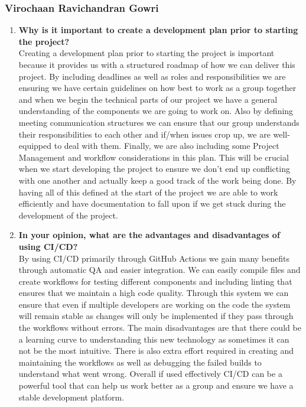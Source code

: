 \documentclass{article}
\begin{document}
\subsubsection*{Virochaan Ravichandran Gowri}
\begin{enumerate}
    \item \textbf{Why is it important to create a development plan prior to starting the
    project?} \\
    Creating a development plan prior to starting the project is important because it provides us with a structured roadmap of how we can deliver this project. By including deadlines as well as roles and responsibilities we are ensuring we have certain guidelines on how best to work as a group together and when we begin the technical parts of our project we have a general understanding of the components we are going to work on. Also by defining meeting communication structures we can ensure that our group understands their responsibilities to each other and if/when issues crop up, we are well-equipped to deal with them. Finally, we are also including some Project Management and workflow considerations in this plan. This will be crucial when we start developing the project to ensure we don't end up conflicting with one another and actually keep a good track of the work being done. By having all of this defined at the start of the project we are able to work efficiently and have documentation to fall upon if we get stuck during the development of the project.
    \item \textbf{In your opinion, what are the advantages and disadvantages of using CI/CD?} \\
    By using CI/CD primarily through GitHub Actions we gain many benefits through automatic QA and easier integration. We can easily compile files and create workflows for testing different components and including linting that ensures that we maintain a high code quality. Through this system we can ensure that even if multiple developers are working on the code the system will remain stable as changes will only be implemented if they pass through the workflows without errors. The main disadvantages are that there could be a learning curve to understanding this new technology as sometimes it can not be the most intuitive. There is also extra effort required in creating and maintaining the workflows as well as debugging the failed builds to understand what went wrong. Overall if used effectively CI/CD can be a powerful tool that can help us work better as a group and ensure we have a stable development platform.
\end{enumerate}
\end{document}
